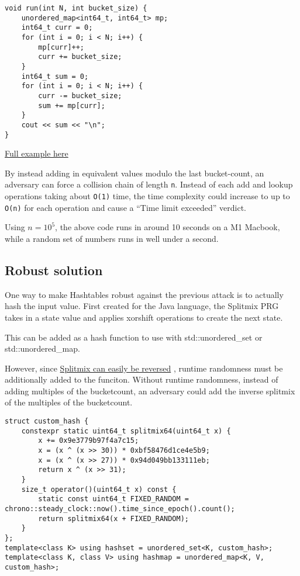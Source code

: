 \documentclass[12pt,a4paper]{article}
\begin{document}
\begin{verbatim}
void run(int N, int bucket_size) {
    unordered_map<int64_t, int64_t> mp;
    int64_t curr = 0;
    for (int i = 0; i < N; i++) {
        mp[curr]++;
        curr += bucket_size;
    }
    int64_t sum = 0;
    for (int i = 0; i < N; i++) {
        curr -= bucket_size;
        sum += mp[curr];
    }
    cout << sum << "\n";
}
\end{verbatim}

\href{https://github.com/takeuchi-masaki/hacking-hashing/blob/main/hashmap/check_bucketsize.cpp}{Full example here}

By instead adding in equivalent values modulo the last bucket-count, an
adversary can force a collision chain of length \texttt{n}. Instead of
each add and lookup operations taking about \texttt{O(1)} time, the time
complexity could increase to up to \texttt{O(n)} for each operation and
cause a ``Time limit exceeded'' verdict.

Using \(n = 10^5\), the above code runs in around 10 seconds on a M1
Macbook, while a random set of numbers runs in well under a second.

\subsection{Robust solution}\label{robust-solution}

One way to make Hashtables robust against the previous attack is to
actually hash the input value. First created for the Java language, the
Splitmix PRG takes in a state value and applies xorshift operations to
create the next state.\cite{Steele_Lea_Flood_2014}

This can be added as a hash function to use with std::unordered\_set or
std::unordered\_map.

However, since
\href{https://github.com/takeuchi-masaki/hacking-hashing/blob/main/hashmap/reverse_splitmix.cpp}{Splitmix can easily be reversed} , runtime randomness must be additionally added
to the funciton. Without runtime randomness, instead of adding multiples
of the bucketcount, an adversary could add the inverse splitmix of the
multiples of the bucketcount.

\begin{verbatim}
struct custom_hash {
    constexpr static uint64_t splitmix64(uint64_t x) {
        x += 0x9e3779b97f4a7c15;
        x = (x ^ (x >> 30)) * 0xbf58476d1ce4e5b9;
        x = (x ^ (x >> 27)) * 0x94d049bb133111eb;
        return x ^ (x >> 31);
    }
    size_t operator()(uint64_t x) const {
        static const uint64_t FIXED_RANDOM = chrono::steady_clock::now().time_since_epoch().count();
        return splitmix64(x + FIXED_RANDOM);
    }
};
template<class K> using hashset = unordered_set<K, custom_hash>;
template<class K, class V> using hashmap = unordered_map<K, V, custom_hash>;
\end{verbatim}
\end{document}
